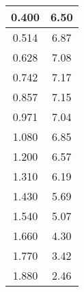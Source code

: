 \begin{table}[htbp]
\begin{minipage}[t]{0.48\textwidth}
\begin{tabular}{|c|c|}
      0.400                                                    & 6.50                                                                      \\ \hline
      0.514                                                    & 6.87                                                                      \\ \hline
      0.628                                                    & 7.08                                                                      \\ \hline
      0.742                                                    & 7.17                                                                      \\ \hline
      0.857                                                    & 7.15                                                                      \\ \hline
      0.971                                                    & 7.04                                                                      \\ \hline
      1.080                                                    & 6.85                                                                      \\ \hline
      1.200                                                    & 6.57                                                                      \\ \hline
      1.310                                                    & 6.19                                                                      \\ \hline
      1.430                                                    & 5.69                                                                      \\ \hline
      1.540                                                    & 5.07                                                                      \\ \hline
      1.660                                                    & 4.30                                                                      \\ \hline
      1.770                                                    & 3.42                                                                      \\ \hline
      1.880                                                    & 2.46                                                                      \\ \hline

\end{tabular}
\end{minipage}
\end{table}
